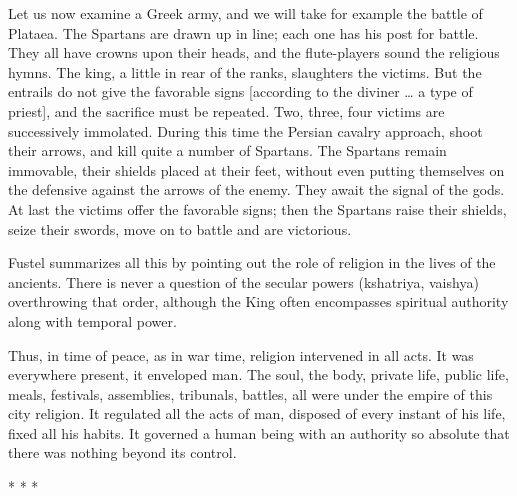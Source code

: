 \begin{quotex}
Let us now examine a Greek army, and we will take for example the battle of Plataea. The Spartans are drawn up in line; each one has his post for battle. They all have crowns upon their heads, and the flute-players sound the religious hymns. The king, a little in rear of the ranks, slaughters the victims. But the entrails do not give the favorable signs [according to the diviner … a type of priest], and the sacrifice must be repeated. Two, three, four victims are successively immolated. During this time the Persian cavalry approach, shoot their arrows, and kill quite a number of Spartans. The Spartans remain immovable, their shields placed at their feet, without even putting themselves on the defensive against the arrows of the enemy. They await the signal of the gods. At last the victims offer the favorable signs; then the Spartans raise their shields, seize their swords, move on to battle and are victorious.

\end{quotex}
Fustel summarizes all this by pointing out the role of religion in the lives of the ancients. There is never a question of the secular powers (kshatriya, vaishya) overthrowing that order, although the King often encompasses spiritual authority along with temporal power.

\begin{quotex}
Thus, in time of peace, as in war time, religion intervened in all acts. It was everywhere present, it enveloped man. The soul, the body, private life, public life, meals, festivals, assemblies, tribunals, battles, all were under the empire of this city religion. It regulated all the acts of man, disposed of every instant of his life, fixed all his habits. It governed a human being with an authority so absolute that there was nothing beyond its control.

\end{quotex}



\begin{center}* * *\end{center}

